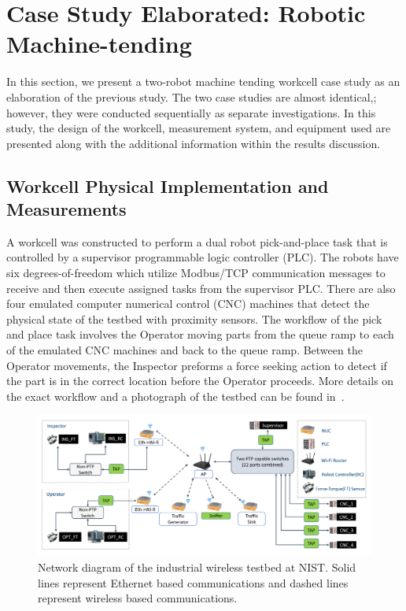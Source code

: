 \section{Case Study Elaborated: Robotic Machine-tending}
In this section, we present a two-robot machine tending workcell case study as an elaboration of the previous study.  The two case studies are almost identical,; however, they were conducted sequentially as separate investigations.  In this study, the design of the workcell, measurement system, and equipment used are presented along with the additional information within the results discussion. 

\subsection{Workcell Physical Implementation and Measurements}

A workcell was constructed to perform a dual robot pick-and-place task that is controlled by a supervisor programmable logic controller (PLC). The robots have six degrees-of-freedom which utilize Modbus/TCP communication messages to receive and then execute assigned tasks from the supervisor PLC. There are also four emulated computer numerical control (CNC) machines that detect the physical state of the testbed with proximity sensors. The workflow of the pick and place task involves the Operator moving parts from the queue ramp to each of the emulated CNC machines and back to the queue ramp. Between the Operator movements, the Inspector preforms a force seeking action to detect if the part is in the correct location before the Operator proceeds. More details on the exact workflow and a photograph of the testbed can be found in~\cite{Liu2019vancouver}. 

\begin{figure}
	\centering
	\includegraphics[width=\textwidth]{chapter-gdb-appl/figures/Fig1TiiSpecialDiagram-testbed2}
	\caption{Network diagram of the industrial wireless testbed at NIST. Solid lines represent Ethernet based communications and dashed lines represent wireless based communications.}
	\label{gdbappl:fig::database:netdiagram}
\end{figure}

